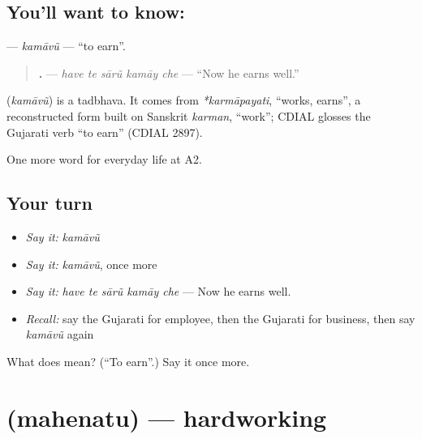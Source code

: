 \subsection*{You'll want to know: }
\textbf{} — \emph{kamāvũ} — \textquotedblleft{}to earn\textquotedblright{}.

\begin{quote}
\textbf{    .} — \emph{have te sārũ kamāy che} — \textquotedblleft{}Now he earns well.\textquotedblright{}
\end{quote}

\begin{cousinweb}
\textbf{} (\emph{kamāvũ}) is a tadbhava. It comes from \emph{*karmāpayati}, \textquotedblleft{}works, earns\textquotedblright{}, a reconstructed form built on Sanskrit \emph{karman}, \textquotedblleft{}work\textquotedblright{}; CDIAL glosses the Gujarati verb \textquotedblleft{}to earn\textquotedblright{} (CDIAL 2897).
\end{cousinweb}

\begin{grammarlens}[title={What you've built}]
One more word for everyday life at A2.
\end{grammarlens}

\subsection*{Your turn}
\begin{itemize}
\raggedright
  \item \emph{Say it:} \emph{kamāvũ}
  \item \emph{Say it:} \emph{kamāvũ}, once more
  \item \emph{Say it:} \emph{have te sārũ kamāy che} — Now he earns well.
  \item \emph{Recall:} say the Gujarati for employee, then the Gujarati for business, then say \emph{kamāvũ} again
\end{itemize}

\begin{tcolorbox}[breakable,colback=teal!4,colframe=teal!35!black,title={Before you move on}]
What does  mean? (\textquotedblleft{}To earn\textquotedblright{}.) Say it once more.
\end{tcolorbox}
\section[\texorpdfstring{\gu{મહેનતુ} (mahenatu)}{મહેનતુ (mahenatu)}]{ (mahenatu) — hardworking}

